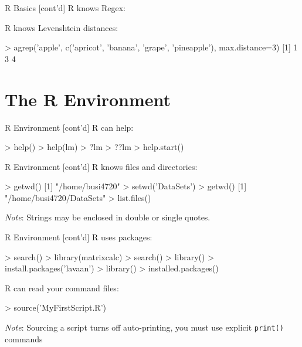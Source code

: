 \documentclass[ignorenonframetext,xcolor=x11names]{beamer}
\begin{document}
\begin{frame}[fragile]{R Basics \small [cont'd]}
R knows Regex:
\footnotesize
{}
\normalsize
R knows Levenshtein distances:
\footnotesize
\begin{Rcode}
> agrep('apple', 
    c('apricot', 'banana', 'grape', 'pineapple'), 
    max.distance=3)
[1] 1 3 4
\end{Rcode}
\end{frame}

\section{The R Environment}

\begin{frame}[fragile]{R Environment \small [cont'd]}
R can help:
\begin{Rcode}
> help()
> help(lm)
> ?lm
> ??lm
> help.start()
\end{Rcode}
\end{frame}

\begin{frame}[fragile]{R Environment \small [cont'd]}
R knows files and directories:
\begin{Rcode}
> getwd()
[1] "/home/busi4720"
> setwd('DataSets')
> getwd()
[1] "/home/busi4720/DataSets"
> list.files()
\end{Rcode}
\emph{Note}: Strings may be enclosed in double or single quotes. \\
\end{frame}

\begin{frame}[fragile]{R Environment \small [cont'd]}
R uses packages:
\begin{Rcode}
> search()
> library(matrixcalc)
> search()
> library()
> install.packages('lavaan')
> library()
> installed.packages()
\end{Rcode}
R can read your command files:
\begin{Rcode}
> source('MyFirstScript.R')
\end{Rcode}
\emph{Note}: Sourcing a script turns off auto-printing, you must use explicit \texttt{print()} commands
\end{frame}
\end{document}
